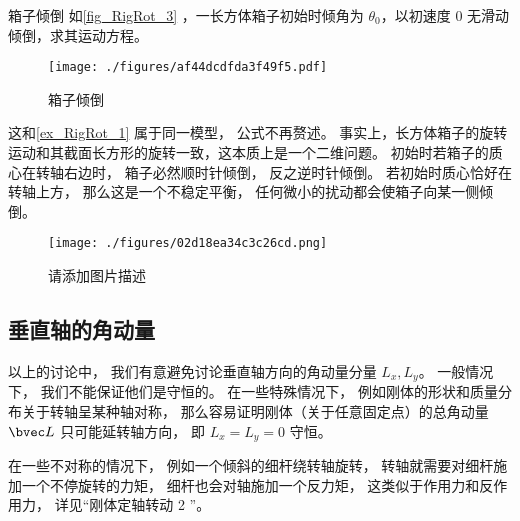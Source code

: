 \begin{example}{箱子倾倒}
如\autoref{fig_RigRot_3} ，一长方体箱子初始时倾角为 $\theta_0$，以初速度 0 无滑动倾倒，求其运动方程。
\begin{figure}[ht]
\centering
\texttt{[image: ./figures/af44dcdfda3f49f5.pdf]}
\caption{箱子倾倒} \label{fig_RigRot_3}
\end{figure}
这和\autoref{ex_RigRot_1} 属于同一模型， 公式不再赘述。 事实上，长方体箱子的旋转运动和其截面长方形的旋转一致，这本质上是一个二维问题。 初始时若箱子的质心在转轴右边时， 箱子必然顺时针倾倒， 反之逆时针倾倒。 若初始时质心恰好在转轴上方， 那么这是一个不稳定平衡， 任何微小的扰动都会使箱子向某一侧倾倒。
\end{example}

\begin{example}{}\label{ex_RigRot_2}
\begin{figure}[ht]
\centering
\texttt{[image: ./figures/02d18ea34c3c26cd.png]}
\caption{请添加图片描述} \label{fig_RigRot_4}
\end{figure}
\end{example}

\subsection{垂直轴的角动量}
以上的讨论中， 我们有意避免讨论垂直轴方向的角动量分量 $L_x, L_y$。 一般情况下， 我们不能保证他们是守恒的。 在一些特殊情况下， 例如刚体的形状和质量分布关于转轴呈某种轴对称， 那么容易证明刚体（关于任意固定点）的总角动量 $\bvec L$ 只可能延转轴方向， 即 $L_x = L_y = 0$ 守恒。 %

在一些不对称的情况下， 例如一个倾斜的细杆绕转轴旋转， %
转轴就需要对细杆施加一个不停旋转的力矩， 细杆也会对轴施加一个反力矩， 这类似于作用力和反作用力， 详见“刚体定轴转动 2 ”。
